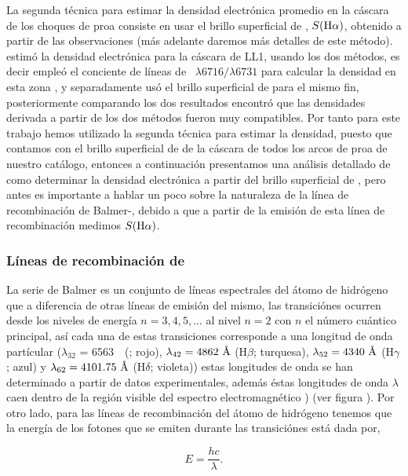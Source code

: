 La segunda técnica para estimar la densidad electrónica promedio en la cáscara de los choques de proa consiste en usar el brillo superficial de \ha{}, \(S(\mathrm{H}\alpha{})\), obtenido a partir de las observaciones (más adelante daremos más detalles de este método). \citet{Henney:2013a} estimó la densidad electrónica para la cáscara de LL1, usando los dos métodos, es decir empleó el conciente de líneas de \sii{}~\(\lambda 6716/\lambda 6731\) para calcular la densidad en esta zona , y separadamente usó el brillo superficial de \ha{} para el mismo fin, posteriormente comparando los dos resultados encontró que las densidades derivada a partir de los dos métodos fueron muy compatibles. Por tanto para este trabajo hemos utilizado la segunda técnica para estimar la densidad, puesto que contamos con el brillo superficial de \ha{} de la cáscara de todos los arcos de proa de nuestro catálogo, entonces a continuación presentamos una análisis detallado de como determinar la densidad electrónica a partir del brillo superficial de \ha{}, pero antes es importante a hablar un poco sobre la naturaleza de la línea de recombinación de Balmer-\ha{}, debido a que a partir de la emisión de esta línea de recombinación medimos \(S(\mathrm{H}\alpha{})\).    

\subsubsection{Líneas de recombinación de \ha{}}
\label{sec:lines-ha}

La serie de Balmer es un conjunto de líneas espectrales del átomo de hidrógeno que a diferencia de otras líneas de emisión del mismo, las transiciónes ocurren desde los niveles de energía \(n= 3,4,5,...\) al nivel \(n=2\) con \(n\) el número cuántico principal, así cada una de estas transiciones corresponde a una longitud de onda partícular (\(\lambda_{32}\) = 6563~\A~(\ha{}; rojo), \(\lambda_{42} = 4862~\text{\AA{}}{}\) (\(\mathrm{H}\beta\); turquesa), \(\lambda_{52} = 4340~\text{\AA{}}{}\) (\(\mathrm{H}\gamma\); azul) y \(\lambda_{62} = 4101.75~\text{\AA{}}{}\) (\(\mathrm{H}\delta\); violeta)) estas longitudes de onda se han determinado a partir de datos experimentales, además éstas longitudes de onda \(\lambda\) caen dentro de la región visible del espectro electromagnético \citep{Carroll:1996}) (ver figura ). Por otro lado, para las líneas de recombinación del átomo de hidrógeno tenemos que la energía de los fotones que se emiten durante las transiciónes está dada por,

\begin{equation}
  \label{eq:energy}
  E = \frac{hc}{\lambda}. 
\end{equation}
 
